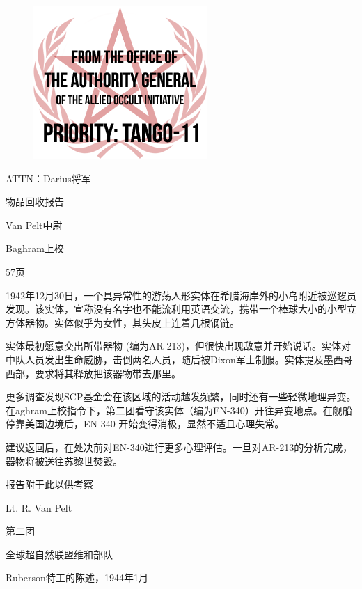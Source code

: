 \begin{tcolorbox}[colframe=black, boxrule=0.5pt, colback=white, center upper, leftright skip=0.12\linewidth, unbreakable]

\begin{figure}[H]
	\centering
	\includegraphics[width=0.6\linewidth]{images/SCP.001.the.broken.god.8.png}
\end{figure}

ATTN：Darius将军

物品回收报告

Van Pelt中尉

Baghram上校

57页

1942年12月30日，一个具异常性的游荡人形实体在希腊海岸外的小岛附近被巡逻员发现。该实体，宣称没有名字也不能流利用英语交流，携带一个棒球大小的小型立方体器物。实体似乎为女性，其头皮上连着几根钢链。

实体最初愿意交出所带器物 (编为AR-213)，但很快出现敌意并开始说话。实体对中队人员发出生命威胁，击倒两名人员，随后被Dixon军士制服。实体提及墨西哥西部，要求将其释放把该器物带去那里。

更多调查发现SCP基金会在该区域的活动越发频繁，同时还有一些轻微地理异变。在aghram上校指令下，第二团看守该实体（编为EN-340）开往异变地点。在舰船停靠美国边境后，EN-340 开始变得消极，显然不适且心理失常。

建议返回后，在处决前对EN-340进行更多心理评估。一旦对AR-213的分析完成，器物将被送往苏黎世焚毁。

报告附于此以供考察

Lt. R. Van Pelt

第二团

全球超自然联盟维和部队

\end{tcolorbox}

Ruberson特工的陈述，1944年1月

